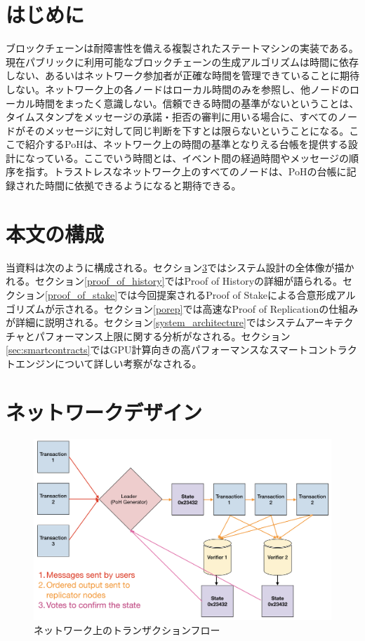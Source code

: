 \documentclass[12pt]{ltjsarticle}
\begin{document}
\section{はじめに}\normalsize
ブロックチェーンは耐障害性を備える複製されたステートマシンの実装である。現在パブリックに利用可能なブロックチェーンの生成アルゴリズムは時間に依存しない、あるいはネットワーク参加者が正確な時間を管理できていることに期待しない\cite{tendermint,hashgraph}。ネットワーク上の各ノードはローカル時間のみを参照し、他ノードのローカル時間をまったく意識しない。信頼できる時間の基準がないということは、タイムスタンプをメッセージの承諾・拒否の審判に用いる場合に、すべてのノードがそのメッセージに対して同じ判断を下すとは限らないということになる。ここで紹介するPoHは、ネットワーク上の時間の基準となりえる台帳を提供する設計になっている。ここでいう時間とは、イベント間の経過時間やメッセージの順序を指す。トラストレスなネットワーク上のすべてのノードは、PoHの台帳に記録された時間に依拠できるようになると期待できる。

\section{本文の構成}
当資料は次のように構成される。セクション\ref{design}ではシステム設計の全体像が描かれる。セクション\ref{proof_of_history}ではProof of Historyの詳細が語られる。セクション\ref{proof_of_stake}では今回提案されるProof of Stakeによる合意形成アルゴリズムが示される。セクション\ref{porep}では高速なProof of Replicationの仕組みが詳細に説明される。セクション\ref{system_architecture}ではシステムアーキテクチャとパフォーマンス上限に関する分析がなされる。セクション\ref{sec:smartcontracts}ではGPU計算向きの高パフォーマンスなスマートコントラクトエンジンについて詳しい考察がなされる。

\section{ネットワークデザイン}\label{design}

\begin{figure}[h]
  \begin{center}
    \centering
    \includegraphics[width=\textwidth]{../../figures/network_design_001.png}
    \caption[Fig 1]{ネットワーク上のトランザクションフロー\label{fig:design}}
  \end{center}
  \end{figure}
\end{document}

